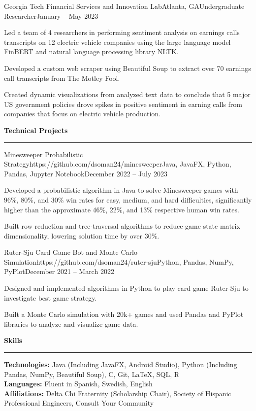\documentclass{article}
\newcommand{\horizontal}{\vspace{2pt}\hrule}
\newcommand{\sectitle}[1]{\vspace{3pt} \textbf{\large #1} \horizontal}
\newcommand{\skill}[2]{\textbf{#1:} #2}
\begin{document}
\begin{flushleft}
    \begin{experience}{Georgia Tech Financial Services and Innovation Lab}{Atlanta, GA}{Undergraduate Researcher}{January -- May 2023}
        \item Led a team of 4 researchers in performing sentiment analysis on earnings calls transcripts on 12 electric vehicle companies using the large language model FinBERT and natural language processing library NLTK.
        \item Developed a custom web scraper using Beautiful Soup to extract over 70 earnings call transcripts from The Motley Fool.
        \item Created dynamic visualizations from analyzed text data to conclude that 5 major US government policies drove spikes in positive sentiment in earning calls from companies that focus on electric vehicle production.
    \end{experience}

\sectitle{Technical Projects}

    \vspace{3pt}

    \begin{project}{Minesweeper Probabilistic Strategy}{https://github.com/dsoman24/minesweeper}{Java, JavaFX, Python, Pandas, Jupyter Notebook}{December 2022 -- July 2023}
        \item Developed a probabilistic algorithm in Java to solve Minesweeper games with 96\%, 80\%, and 30\% win rates for easy, medium, and hard difficulties, significantly higher than the approximate 46\%, 22\%, and 13\% respective human win rates.
        \item Built row reduction and tree-traversal algorithms to reduce game state matrix dimensionality, lowering solution time by over 30\%.
    \end{project}

    \begin{project}{Ruter-Sju Card Game Bot and Monte Carlo Simulation}{https://github.com/dsoman24/ruter-sju}{Python, Pandas, NumPy, PyPlot}{December 2021 -- March 2022}
        \item Designed and implemented algorithms in Python to play card game Ruter-Sju to investigate best game strategy.
        \item Built a Monte Carlo simulation with 20k+ games and used Pandas and PyPlot libraries to analyze and visualize game data.
    \end{project}

\sectitle{Skills}

    \vspace{3pt}
    \skill{Technologies}{Java (Including JavaFX, Android Studio), Python (Including Pandas, NumPy, Beautiful Soup), C, Git, LaTeX, SQL, R} \\
    \skill{Languages}{Fluent in Spanish, Swedish, English} \\
    \skill{Affiliations}{Delta Chi Fraternity (Scholarship Chair), Society of Hispanic Professional Engineers, Consult Your Community}

\end{flushleft}
\end{document}
